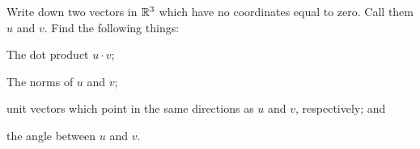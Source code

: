 \documentclass[elementsmain.tex]{subfiles}
\begin{document}
\begin{exercise}
Write down two vectors in $\mathbb{R}^3$ which have no coordinates equal to zero. Call them $u$ and $v$. Find the following things:
\begin{compactitem}
\item The dot product $u\cdot v$;
\item The norms of $u$ and $v$;
\item unit vectors which point in the same directions as $u$ and $v$, respectively; and
\item the angle between $u$ and $v$.
\end{compactitem}
\end{exercise}

\clearpage
\end{document}
